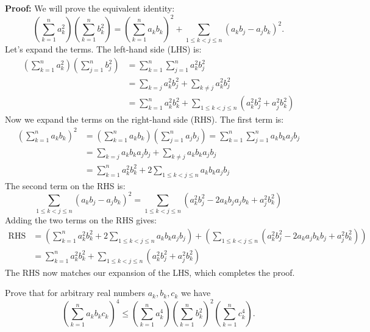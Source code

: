     \textbf{Proof:}
    We will prove the equivalent identity:
    \[
    \left( \sum_{k=1}^n a_k^2 \right)\left( \sum_{k=1}^n b_k^2 \right) = \left( \sum_{k=1}^n a_k b_k \right)^2 + \sum_{1 \leq k < j \leq n} (a_k b_j - a_j b_k)^2.
    \]
    Let's expand the terms. The left-hand side (LHS) is:
    \begin{align*}
    \left( \sum_{k=1}^n a_k^2 \right)\left( \sum_{j=1}^n b_j^2 \right) &= \sum_{k=1}^n \sum_{j=1}^n a_k^2 b_j^2 \\
    &= \sum_{k=j} a_k^2 b_j^2 + \sum_{k \neq j} a_k^2 b_j^2 \\
    &= \sum_{k=1}^n a_k^2 b_k^2 + \sum_{1 \leq k < j \leq n} (a_k^2 b_j^2 + a_j^2 b_k^2)
    \end{align*}
    Now we expand the terms on the right-hand side (RHS). The first term is:
    \begin{align*}
    \left( \sum_{k=1}^n a_k b_k \right)^2 &= \left( \sum_{k=1}^n a_k b_k \right)\left( \sum_{j=1}^n a_j b_j \right) = \sum_{k=1}^n \sum_{j=1}^n a_k b_k a_j b_j \\
    &= \sum_{k=j} a_k b_k a_j b_j + \sum_{k \neq j} a_k b_k a_j b_j \\
    &= \sum_{k=1}^n a_k^2 b_k^2 + 2 \sum_{1 \leq k < j \leq n} a_k b_k a_j b_j
    \end{align*}
    The second term on the RHS is:
    \[
    \sum_{1 \leq k < j \leq n} (a_k b_j - a_j b_k)^2 = \sum_{1 \leq k < j \leq n} (a_k^2 b_j^2 - 2a_k b_j a_j b_k + a_j^2 b_k^2)
    \]
    Adding the two terms on the RHS gives:
    \begin{align*}
    \text{RHS} &= \left( \sum_{k=1}^n a_k^2 b_k^2 + 2 \sum_{1 \leq k < j \leq n} a_k b_k a_j b_j \right) + \left( \sum_{1 \leq k < j \leq n} (a_k^2 b_j^2 - 2a_k a_j b_k b_j + a_j^2 b_k^2) \right) \\
    &= \sum_{k=1}^n a_k^2 b_k^2 + \sum_{1 \leq k < j \leq n} (a_k^2 b_j^2 + a_j^2 b_k^2)
    \end{align*}
    The RHS now matches our expansion of the LHS, which completes the proof.


    \begin{problembox}
        Prove that for arbitrary real numbers \( a_k, b_k, c_k \) we have
        \[
        \left( \sum_{k=1}^n a_k b_k c_k \right)^4 \leq
        \left( \sum_{k=1}^n a_k^4 \right)
        \left( \sum_{k=1}^n b_k^2 \right)^2
        \left( \sum_{k=1}^n c_k^4 \right).
        \]
        \end{problembox}
        
